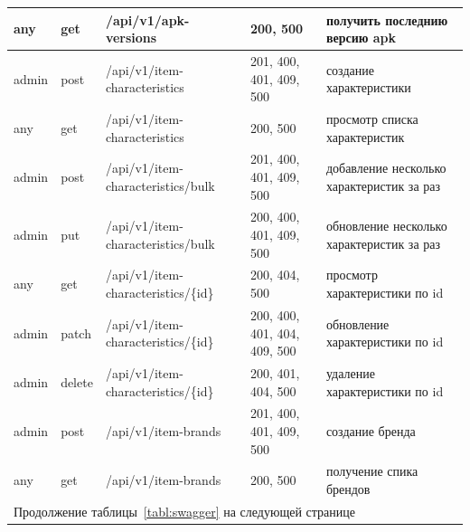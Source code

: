 \begin{table}
\begin{tabular}{|p{1cm}|p{1cm}|p{8.5cm}|p{4.8cm}|p{8.5cm}|}
        any & get & /api/v1/apk-versions & 200, 500 & получить последнию версию apk \\ \hline 
        admin & post & /api/v1/item-characteristics & 201, 400, 401, 409, 500 & создание характеристики \\ \hline 
        any & get & /api/v1/item-characteristics & 200, 500 & просмотр списка характеристик \\ \hline 
        admin & post & /api/v1/item-characteristics/bulk & 201, 400, 401, 409, 500 & добавление несколько характеристик за раз \\ \hline 
        admin & put & /api/v1/item-characteristics/bulk & 200, 400, 401, 409, 500 & обновление несколько характеристик за раз \\ \hline 
        any & get & /api/v1/item-characteristics/\{id\} & 200, 404, 500 & просмотр характеристики по id \\ \hline 
        admin & patch & /api/v1/item-characteristics/\{id\} & 200, 400, 401, 404, 409, 500 & обновление характеристики по id \\ \hline 
        admin & delete & /api/v1/item-characteristics/\{id\} & 200, 401, 404, 500 & удаление характеристики по id \\ \hline 
        admin & post & /api/v1/item-brands & 201, 400, 401, 409, 500 & создание бренда \\ \hline 
        any & get & /api/v1/item-brands & 200, 500 & получение спика брендов \\ \hline  
        \multicolumn{5}{l}{Продолжение таблицы~\ref{tabl:swagger} на следующей странице} \\
    \end{tabular}
\end{table}
